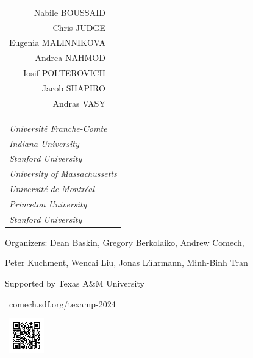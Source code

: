 \documentclass[a3,portrait]{a0poster}
\begin{document}
\bf
\normalsize
\Large
\hskip -1.9cm
\begin{tabular}{r}
Nabile BOUSSAID
\\
Chris JUDGE
\\
Eugenia MALINNIKOVA
\\
Andrea NAHMOD
\\
Iosif POLTEROVICH
\\
Jacob SHAPIRO
\\
Andras VASY
\end{tabular}
\begin{tabular}{l}
\it
Universit\'{e} Franche-Comte
\\
\it
Indiana University
\\
\it
Stanford University
\\
\it
University of Massachussetts
\\
\it
Universit\'{e} de Montr\'{e}al
\\
\it
Princeton University
\\
\it
Stanford University
\end{tabular}


\vskip 3cm

\color{MidnightBlue}

\normalsize

{\bsifamily Organizers:}
Dean Baskin, Gregory Berkolaiko, Andrew Comech,

Peter Kuchment,
Wencai Liu, Jonas L\"{u}hrmann, Minh-Binh Tran


\vskip 0.5cm

\hskip 6cm
Supported by %
Texas A\&M University


\vskip 1cm

\hskip 11cm
\mbox{
\normalsize
comech.sdf.org/texamp-2024
}

\vskip -16mm
\hskip 22.5cm
\mbox{
\includegraphics[height=15mm]{texamp-2024-qr.png}
}
\end{document}
